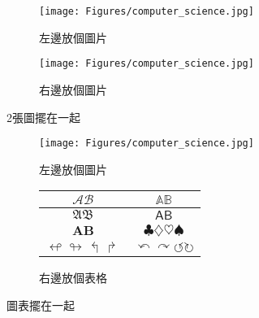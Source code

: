 \begin{figure}[hbpt]
    \centering
    \begin{subfigure}{0.45\linewidth}
        \texttt{[image: Figures/computer\_science.jpg]}
        \caption{左邊放個圖片}
    \end{subfigure}
    \hfill
    \begin{subfigure}{0.45\linewidth}
        \texttt{[image: Figures/computer\_science.jpg]}
        \caption{右邊放個圖片}
    \end{subfigure}
    \caption{2張圖擺在一起}
    \label{fig:figexample2}
\end{figure}

\begin{figure}[hbpt]
    \centering
    \begin{subfigure}{0.4\linewidth}
        \texttt{[image: Figures/computer\_science.jpg]}
        \caption{左邊放個圖片}
    \end{subfigure}
    \hfill
    \begin{subfigure}{0.48\linewidth}
        \centering
        \begin{tabular}{c | c }
            $\mathcal{A} \mathcal{B}  $                   & $\mathbb{A} \mathbb{B}  $                                               \\
            \hline \hline
            $\mathfrak{A} \mathfrak{B}  $                 & $\mathsf{A} \mathsf{B}  $                                               \\
            $\mathbf{A} \mathbf{B}  $                     & $\clubsuit \diamondsuit \heartsuit \spadesuit  $                        \\
            $ \looparrowleft \looparrowright \Lsh \Rsh  $ & $\curvearrowleft \curvearrowright \circlearrowleft \circlearrowright  $ \\
        \end{tabular}
        \caption{右邊放個表格}
    \end{subfigure}
    \caption{圖表擺在一起}
    \label{fig:figexample3}
\end{figure}